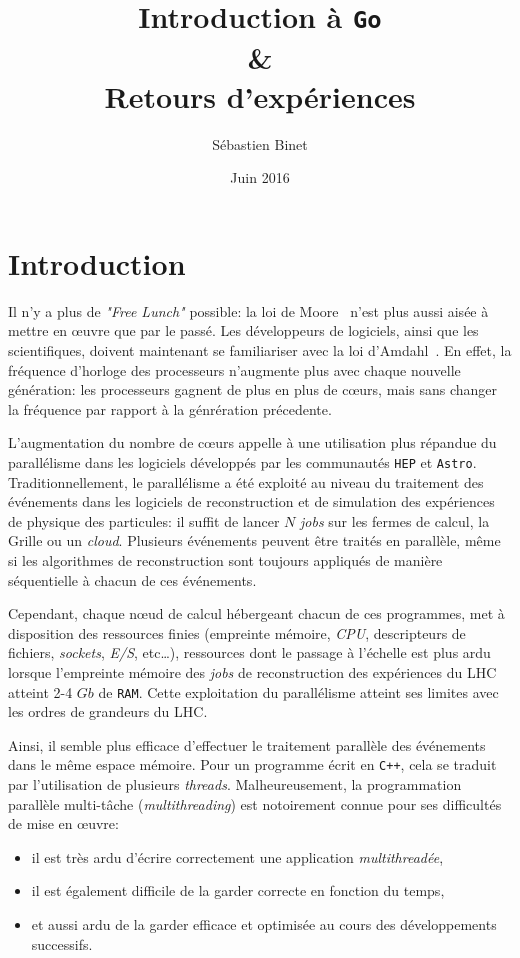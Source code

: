 \documentclass[a4paper,french]{article}
\title{Introduction \`a \texttt{Go}\\ \&\\ Retours d'exp\'eriences}
\author{S\'ebastien Binet}
\date{Juin 2016}
\affil{CNRS/IN2P3/LPC}
\begin{document}
\maketitle

\section{Introduction}

Il n'y a plus de \emph{"Free Lunch"} possible: la loi de Moore~\cite{ref-moore}
n'est plus aussi ais\'ee \`a mettre en {\oe}uvre que par le pass\'e.
Les d\'eveloppeurs de logiciels, ainsi que les scientifiques, doivent maintenant
se familiariser avec la loi d'Amdahl~\cite{ref-amdahl}.
En effet, la fr\'equence d'horloge des processeurs n'augmente plus avec chaque
nouvelle g\'en\'eration: les processeurs gagnent de plus en plus de c\oe urs,
mais sans changer la fr\'equence par rapport \`a la g\'enr\'eration
pr\'ecedente.

L'augmentation du nombre de c\oe urs appelle \`a une utilisation plus
r\'epandue du parall\'elisme dans les logiciels d\'evelopp\'es par les
communaut\'es \texttt{HEP} et \texttt{Astro}.
Traditionnellement, le parall\'elisme a \'et\'e exploit\'e au niveau du
traitement des \'ev\'enements dans les logiciels de reconstruction et de
simulation des exp\'eriences de physique des particules: il suffit de lancer $N$
\emph{jobs} sur les fermes de calcul, la Grille ou un \emph{cloud}.
Plusieurs \'ev\'enements peuvent \^etre trait\'es en parall\`ele, m\^eme si les
algorithmes de reconstruction sont toujours appliqu\'es de mani\`ere
s\'equentielle \`a chacun de ces \'ev\'enements.

Cependant, chaque n\oe ud de calcul h\'ebergeant chacun de ces programmes, met \`a
disposition des ressources finies (empreinte m\'emoire, \emph{CPU}, descripteurs
de fichiers, \emph{sockets}, \emph{E/S}, etc\ldots), ressources dont le passage \`a
l'\'echelle est plus ardu lorsque l'empreinte m\'emoire des \emph{jobs} de
reconstruction des exp\'eriences du LHC atteint 2-4 $Gb$ de \texttt{RAM}.
Cette exploitation du parall\'elisme atteint ses limites avec les
ordres de grandeurs du LHC.

Ainsi, il semble plus efficace d'effectuer le traitement parall\`ele des
\'ev\'enements dans le m\^eme espace m\'emoire.
Pour un programme \'ecrit en \texttt{C++}, cela se traduit par l'utilisation de
plusieurs \emph{threads}.
Malheureusement, la programmation parall\`ele multi-t\^ache
(\emph{multithreading}) est notoirement connue pour ses difficult\'es de mise en
\oe uvre:
\begin{itemize}
	\item il est tr\`es ardu d'\'ecrire correctement une application \emph{multithread\'ee},
	\item il est \'egalement difficile de la garder correcte en fonction du
		temps,
	\item et aussi ardu de la garder efficace et optimis\'ee au cours des
		d\'eveloppements successifs.
\end{itemize}
\end{document}
